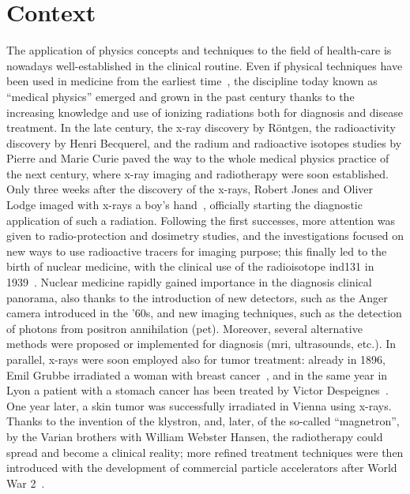 \chapter{Context}\label{chap::1}

\vfill

\minitoc

\newpage

\glsresetall

The application of physics concepts and techniques to the field of health-care is nowadays well-established in the clinical routine. Even if physical techniques have been used in medicine from the earliest time~\parencite{Duck2014}, the discipline today known as \enquote{medical physics} emerged and grown in the past century thanks to the increasing knowledge and use of ionizing radiations both for diagnosis and disease treatment. In the late  century, the x-ray discovery by R\"{o}ntgen, the radioactivity discovery by Henri Becquerel, and the radium and radioactive isotopes studies by Pierre and Marie Curie paved the way to the whole medical physics practice of the next century, where x-ray imaging and radiotherapy were soon established. Only three weeks after the discovery of the x-rays, Robert Jones and Oliver Lodge imaged with x-rays a boy's hand~\parencite{Cantor1988}, officially starting the diagnostic application of such a radiation. Following the first successes, more attention was given to radio-protection and dosimetry studies, and the investigations focused on new ways to use radioactive tracers for imaging purpose; this finally led to the birth of nuclear medicine, with the clinical use of the radioisotope \gls{ind131} in 1939~\parencite{Kereiakes1987}. Nuclear medicine rapidly gained importance in the diagnosis clinical panorama, also thanks to the introduction of new detectors, such as the Anger camera introduced in the '60s, and new imaging techniques, such as the detection of photons from positron annihilation (\gls{pet}). Moreover, several alternative methods were proposed or implemented for diagnosis (\gls{mri}, ultrasounds, etc.). In parallel, x-rays were soon employed also for tumor treatment: already in 1896, Emil Grubbe irradiated a woman with breast cancer~\parencite{Evans1951}, and in the same year in Lyon a patient with a stomach cancer has been treated by Victor Despeignes~\parencite{Despeignes1896, Foray2016}. One year later, a skin tumor was successfully irradiated in Vienna using x-rays. Thanks to the invention of the klystron, and, later, of the so-called \enquote{magnetron}, by the Varian brothers with William Webster Hansen, the radiotherapy could spread and become a clinical reality; more refined treatment techniques were then introduced with the development of commercial particle accelerators after World War 2~\parencite{Keevil2012}. 

